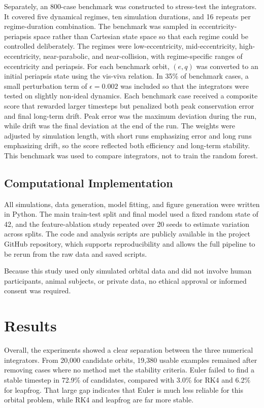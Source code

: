 \documentclass[12pt]{article}
\begin{document}
Separately, an 800-case benchmark was constructed to stress-test the integrators. It covered five dynamical regimes, ten simulation durations, and 16 repeats per regime-duration combination. The benchmark was sampled in eccentricity-periapsis space rather than Cartesian state space so that each regime could be controlled deliberately. The regimes were low-eccentricity, mid-eccentricity, high-eccentricity, near-parabolic, and near-collision, with regime-specific ranges of eccentricity and periapsis. For each benchmark orbit, $(e,q)$ was converted to an initial periapsis state using the vis-viva relation. In 35\% of benchmark cases, a small perturbation term of $\epsilon = 0.002$ was included so that the integrators were tested on slightly non-ideal dynamics. Each benchmark case received a composite score that rewarded larger timesteps but penalized both peak conservation error and final long-term drift. Peak error was the maximum deviation during the run, while drift was the final deviation at the end of the run. The weights were adjusted by simulation length, with short runs emphasizing error and long runs emphasizing drift, so the score reflected both efficiency and long-term stability. This benchmark was used to compare integrators, not to train the random forest.

\subsection{Computational Implementation}
All simulations, data generation, model fitting, and figure generation were written in Python. The main train-test split and final model used a fixed random state of 42, and the feature-ablation study repeated over 20 seeds to estimate variation across splits. The code and analysis scripts are publicly available in the project GitHub repository, which supports reproducibility and allows the full pipeline to be rerun from the raw data and saved scripts.

Because this study used only simulated orbital data and did not involve human participants, animal subjects, or private data, no ethical approval or informed consent was required.

\section{Results}

Overall, the experiments showed a clear separation between the three numerical integrators. From 20,000 candidate orbits, 19,380 usable examples remained after removing cases where no method met the stability criteria. Euler failed to find a stable timestep in 72.9\% of candidates, compared with 3.0\% for RK4 and 6.2\% for leapfrog. That large gap indicates that Euler is much less reliable for this orbital problem, while RK4 and leapfrog are far more stable.
\end{document}

